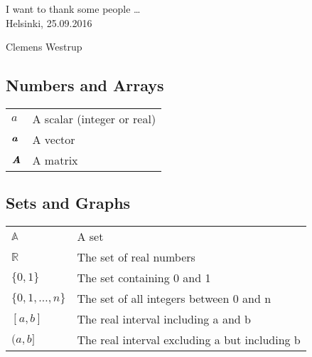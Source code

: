\newpage




%



I want to thank some people \ldots
\\

\vspace{5cm}
Helsinki, 25.09.2016

\vspace{5mm}
{\hfill Clemens Westrup \hspace{1cm}}

\newpage

{\hypersetup{linkcolor=black}
\thesistableofcontents
}
\clearpage


\subsection*{Numbers and Arrays}

\begin{tabular}{ll}
  $a$                 & A scalar (integer or real) \\
  $\textbf{\em a}$        & A vector \\
  $\textbf{\em A}$        & A matrix \\
\end{tabular}

\subsection*{Sets and Graphs}

\begin{tabular}{ll}
  $\mathbb{A}$        & A set \\
  $\mathbb{R}$        & The set of real numbers \\
  $\{0, 1\}$          & The set containing 0 and 1 \\
  $\{0,1,\ldots,n\}$  & The set of all integers between 0 and n \\
  $[a, b]$            & The real interval including a and b \\
  $(a, b]$            & The real interval excluding a but including b \\
\end{tabular}



